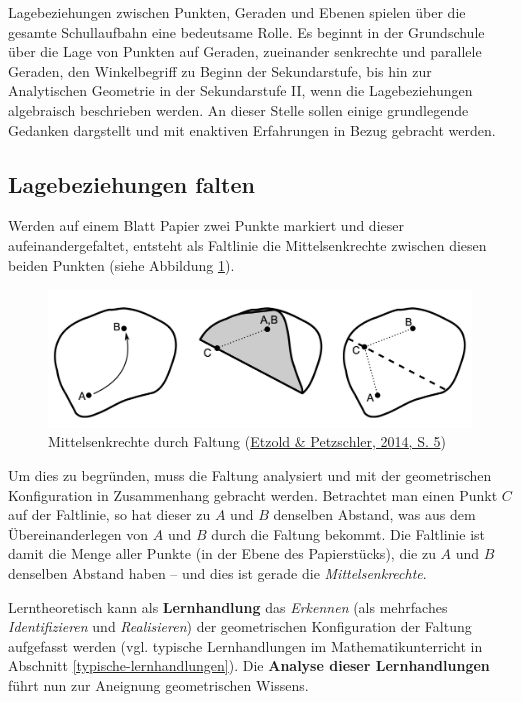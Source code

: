 \documentclass[
]{scrbook}
\theoremstyle{definition}
\theoremstyle{definition}
\theoremstyle{definition}
\theoremstyle{definition}
\theoremstyle{remark}
\begin{document}
Lagebeziehungen zwischen Punkten, Geraden und Ebenen spielen über die gesamte Schullaufbahn eine bedeutsame Rolle. Es beginnt in der Grundschule über die Lage von Punkten auf Geraden, zueinander senkrechte und parallele Geraden, den Winkelbegriff zu Beginn der Sekundarstufe, bis hin zur Analytischen Geometrie in der Sekundarstufe II, wenn die Lagebeziehungen algebraisch beschrieben werden. An dieser Stelle sollen einige grundlegende Gedanken dargstellt und mit enaktiven Erfahrungen in Bezug gebracht werden.

\hypertarget{lagebeziehungen-falten}{%
\subsection{Lagebeziehungen falten}\label{lagebeziehungen-falten}}

Werden auf einem Blatt Papier zwei Punkte markiert und dieser aufeinandergefaltet, entsteht als Faltlinie die Mittelsenkrechte zwischen diesen beiden Punkten (siehe Abbildung \ref{fig:Mittelsenkrechte}).



\begin{figure}

{\centering \includegraphics[width=0.75\linewidth]{pictures/12-Mittelsenkrechte} 

}

\caption{Mittelsenkrechte durch Faltung (\protect\hyperlink{ref-Etzold2014a}{Etzold \& Petzschler, 2014, S. 5})}\label{fig:Mittelsenkrechte}
\end{figure}

Um dies zu begründen, muss die Faltung analysiert und mit der geometrischen Konfiguration in Zusammenhang gebracht werden. Betrachtet man einen Punkt \(C\) auf der Faltlinie, so hat dieser zu \(A\) und \(B\) denselben Abstand, was aus dem Übereinanderlegen von \(A\) und \(B\) durch die Faltung bekommt. Die Faltlinie ist damit die Menge aller Punkte (in der Ebene des Papierstücks), die zu \(A\) und \(B\) denselben Abstand haben -- und dies ist gerade die \emph{Mittelsenkrechte}.

Lerntheoretisch kann als \textbf{Lernhandlung} das \emph{Erkennen} (als mehrfaches \emph{Identifizieren} und \emph{Realisieren}) der geometrischen Konfiguration der Faltung aufgefasst werden (vgl. typische Lernhandlungen im Mathematikunterricht in Abschnitt \ref{typische-lernhandlungen}). Die \textbf{Analyse dieser Lernhandlungen} führt nun zur Aneignung geometrischen Wissens.
\end{document}
